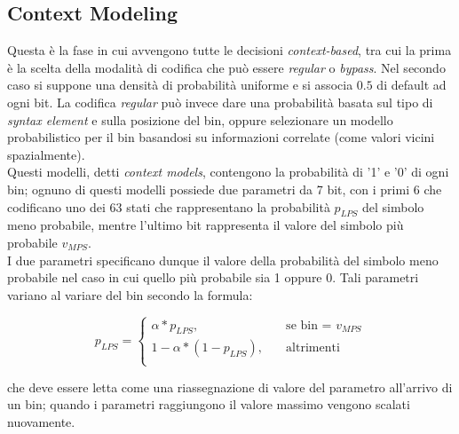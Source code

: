 \subsection{Context Modeling}
Questa è la fase in cui avvengono tutte le decisioni \emph{context-based}, tra
cui la prima è la scelta della modalità di codifica che può essere \emph{
regular} o \emph{bypass}. Nel secondo caso si suppone una densità di probabilità
uniforme e si associa $0.5$ di default ad ogni bit. La codifica \emph{regular}
può invece dare una probabilità basata sul tipo di \emph{syntax element} e sulla
posizione del bin, oppure selezionare un modello probabilistico per il bin 
basandosi su informazioni correlate (come valori vicini spazialmente). \\
Questi modelli, detti \emph{context models}, contengono la probabilità di '1' e
'0' di ogni bin; ognuno di questi modelli possiede due parametri  da 7 bit, con
i primi 6 che codificano uno dei 63 stati che rappresentano la probabilità 
$p_{LPS}$ del simbolo meno probabile, mentre l'ultimo bit rappresenta il valore 
del simbolo più probabile $v_{MPS}$. \\
I due parametri specificano dunque il valore della probabilità del simbolo meno
probabile nel caso in cui quello più probabile sia 1 oppure 0. Tali parametri 
variano al variare del bin secondo la formula:

\[ p_{LPS} = 
\begin{cases}
  \alpha * p_{LPS},         & \quad \text{se bin = } v_{MPS} \\
  1- \alpha *(1-p_{LPS}),   & \quad \text{altrimenti} \\
\end{cases}
\]

che deve essere letta come una riassegnazione di valore del parametro all'arrivo
di un bin; quando i parametri raggiungono il valore massimo vengono scalati
nuovamente.


